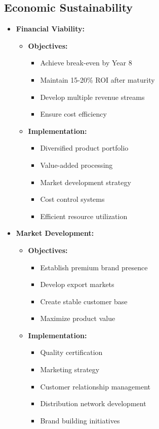 \subsection{Economic Sustainability}
\begin{itemize}
    \item \textbf{Financial Viability:}
    \begin{itemize}
        \item \textbf{Objectives:}
        \begin{itemize}
            \item Achieve break-even by Year 8
            \item Maintain 15-20\% ROI after maturity
            \item Develop multiple revenue streams
            \item Ensure cost efficiency
        \end{itemize}
        \item \textbf{Implementation:}
        \begin{itemize}
            \item Diversified product portfolio
            \item Value-added processing
            \item Market development strategy
            \item Cost control systems
            \item Efficient resource utilization
        \end{itemize}
    \end{itemize}
    
    \item \textbf{Market Development:}
    \begin{itemize}
        \item \textbf{Objectives:}
        \begin{itemize}
            \item Establish premium brand presence
            \item Develop export markets
            \item Create stable customer base
            \item Maximize product value
        \end{itemize}
        \item \textbf{Implementation:}
        \begin{itemize}
            \item Quality certification
            \item Marketing strategy
            \item Customer relationship management
            \item Distribution network development
            \item Brand building initiatives
        \end{itemize}
    \end{itemize}
    

\end{itemize}
